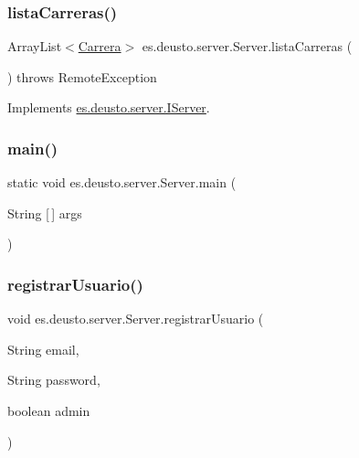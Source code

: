 \mbox{\label{classes_1_1deusto_1_1server_1_1_server_af62ce3462ec30a081db0009d2f2b33bb}} 
\subsubsection{\texorpdfstring{listaCarreras()}{listaCarreras()}}
{\footnotesize\ttfamily Array\+List$<$\mbox{\hyperlink{classes_1_1deusto_1_1server_1_1jdo_1_1_carrera}{Carrera}}$>$ es.\+deusto.\+server.\+Server.\+lista\+Carreras (\begin{DoxyParamCaption}{ }\end{DoxyParamCaption}) throws Remote\+Exception}



Implements \mbox{\hyperlink{interfacees_1_1deusto_1_1server_1_1_i_server_a13c17b07c8114d16130053aecdd455bb}{es.\+deusto.\+server.\+I\+Server}}.

\mbox{\label{classes_1_1deusto_1_1server_1_1_server_a750bb0d7dbd89246a3602f2e20d03fb5}} 
\subsubsection{\texorpdfstring{main()}{main()}}
{\footnotesize\ttfamily static void es.\+deusto.\+server.\+Server.\+main (\begin{DoxyParamCaption}\item[{String \mbox{[}$\,$\mbox{]}}]{args }\end{DoxyParamCaption})\hspace{0.3cm}{\ttfamily [static]}}

\mbox{\label{classes_1_1deusto_1_1server_1_1_server_a0f79b8db6904facdae94410e26bef452}} 
\subsubsection{\texorpdfstring{registrarUsuario()}{registrarUsuario()}}
{\footnotesize\ttfamily void es.\+deusto.\+server.\+Server.\+registrar\+Usuario (\begin{DoxyParamCaption}\item[{String}]{email,  }\item[{String}]{password,  }\item[{boolean}]{admin }\end{DoxyParamCaption})}



